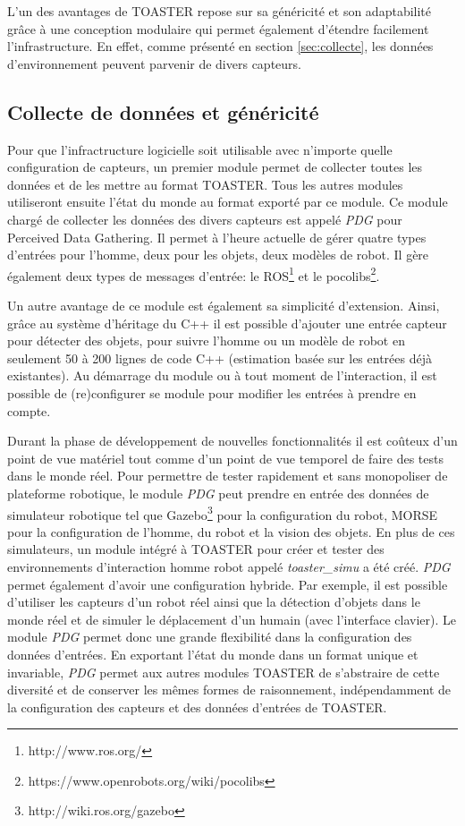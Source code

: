 \documentclass[a4paper,11pt,twoside]{StyleThese}
\begin{document}
L'un des avantages de TOASTER repose sur sa généricité et son adaptabilité grâce à une conception modulaire qui permet également d'étendre facilement l'infrastructure. En effet, comme présenté en section \ref{sec:collecte}, les données d'environnement peuvent parvenir de divers capteurs.

\subsection{Collecte de données et généricité}
\label{sec:PDG}
Pour que l'infractructure logicielle soit utilisable avec n'importe quelle configuration de capteurs, un premier module permet de collecter toutes les données et de les mettre au format TOASTER. Tous les autres modules utiliseront ensuite l'état du monde au format exporté par ce module. Ce module chargé de collecter les données des divers capteurs est appelé \textit{PDG} pour Perceived Data Gathering.
Il permet à l'heure actuelle de gérer quatre types d'entrées pour l'homme, deux pour les objets, deux modèles de robot. Il gère également deux types de messages d'entrée: le ROS\footnote{http://www.ros.org/} et le pocolibs\footnote{https://www.openrobots.org/wiki/pocolibs}.

Un autre avantage de ce module est également sa simplicité d'extension. Ainsi, grâce au système d'héritage du C++ il est possible d'ajouter une entrée capteur pour détecter des objets, pour suivre l'homme ou un modèle de robot en seulement 50 à 200 lignes de code C++ (estimation basée sur les entrées déjà existantes).
Au démarrage du module ou à tout moment de l'interaction, il est possible de (re)configurer se module pour modifier les entrées à prendre en compte.

Durant la phase de développement de nouvelles fonctionnalités il est coûteux d'un point de vue matériel tout comme d'un point de vue temporel de faire des tests dans le monde réel. Pour permettre de tester rapidement et sans monopoliser de plateforme robotique, le module \textit{PDG} peut prendre en entrée des données de simulateur robotique tel que Gazebo\footnote{http://wiki.ros.org/gazebo} pour la configuration du robot, MORSE\cite{echeverria11} pour la configuration de l'homme, du robot et la vision des objets. En plus de ces simulateurs, un module intégré à TOASTER pour créer et tester des environnements d'interaction homme robot appelé \textit{toaster\_simu} a été créé. \textit{PDG} permet également d'avoir une configuration hybride.
Par exemple, il est possible d'utiliser les capteurs d'un robot réel ainsi que la détection d'objets dans le monde réel et de simuler le déplacement d'un humain (avec l'interface clavier).
Le module \textit{PDG} permet donc une grande flexibilité dans la configuration des données d'entrées. En exportant l'état du monde dans un format unique et invariable, \textit{PDG} permet aux autres modules TOASTER de s'abstraire de cette diversité et de conserver les mêmes formes de raisonnement, indépendamment de la configuration des capteurs et des données d'entrées de TOASTER.
\end{document}
